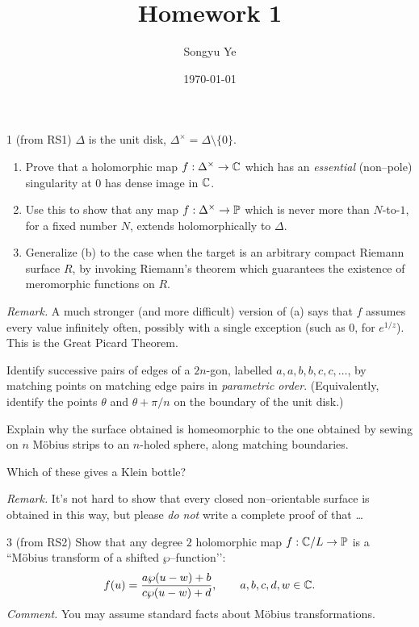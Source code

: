 \documentclass[12pt]{article}  %
\title{Homework 1}
\author{Songyu Ye}
\date{\today}
\begin{document}
\psettitle

\begin{problem}{1 (from RS1)}
$\Delta$ is the unit disk, $\Delta^\times = \Delta \setminus \{0\}$.
\begin{enumerate}
  \item Prove that a holomorphic map $f:\Delta^\times \to \C$ which has an \emph{essential} (non–pole) singularity at $0$ has dense image in $\C$.
  \item Use this to show that any map $f:\Delta^\times \to \P$ which is never more than $N$-to-$1$, for a fixed number $N$, extends holomorphically to $\Delta$.
  \item Generalize (b) to the case when the target is an arbitrary compact Riemann surface $R$, by invoking Riemann’s theorem which guarantees the existence of meromorphic functions on $R$.
\end{enumerate}
\emph{Remark.} A much stronger (and more difficult) version of (a) says that $f$ assumes every value infinitely often, possibly with a single exception (such as $0$, for $e^{1/z}$). This is the Great Picard Theorem.
\end{problem}

\begin{solution}
\end{solution}

\begin{problem}{2}
Identify successive pairs of edges of a $2n$-gon, labelled $a,a,b,b,c,c,\dots$, by matching points on matching edge pairs in \emph{parametric order}. (Equivalently, identify the points $\theta$ and $\theta+\pi/n$ on the boundary of the unit disk.) 

Explain why the surface obtained is homeomorphic to the one obtained by sewing on $n$ M{\"o}bius strips to an $n$-holed sphere, along matching boundaries. 

Which of these gives a Klein bottle?

\emph{Remark.} It’s not hard to show that every closed non–orientable surface is obtained in this way, but please \emph{do not} write a complete proof of that \dots
\end{problem}

\begin{solution}
\end{solution}

\begin{problem}{3 (from RS2)}
Show that any degree $2$ holomorphic map $f:\C/L \to \P$ is a “M{\"o}bius transform of a shifted $\wp$–function’’:
\[
  f(u) = \frac{a\wp(u-w)+b}{c\wp(u-w)+d}, \qquad a,b,c,d,w \in \C.
\]
\emph{Comment.} You may assume standard facts about M{\"o}bius transformations.
\end{problem}
\end{document}

